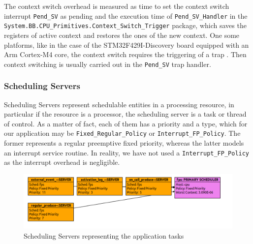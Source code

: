 \documentclass{article}
\begin{document}
The context switch overhead is measured as time to set the context switch interrupt \texttt{Pend\_SV} as pending and the execution time of \texttt{Pend\_SV\_Handler} in the \texttt{System.BB.CPU\_Primitives.Context\_Switch\_Trigger} package, which saves the registers of active context and restores the ones of the new context. One some platforms, like in the case of the STM32F429I-Discovery board equipped with an Arm Cortex-M4 core, the context switch requires the triggering of a trap \cite{pendsv}. Then context switching is usually carried out in the \texttt{Pend\_SV} trap handler.

\subsubsection{Scheduling Servers}

Scheduling Servers represent schedulable entities in a processing resource, in particular if the resource is a processor, the scheduling server is a task or thread of control. As a matter of fact, each of them has a priority and a type, which for our application may be \texttt{Fixed\_Regular\_Policy} or \texttt{Interrupt\_FP\_Policy}. The former represents a regular preemptive fixed priority, whereas the latter models an interrupt service routine. In reality, we have not used a \texttt{Interrupt\_FP\_Policy} as the interrupt overhead is negligible.

\begin{figure}[!htbp]
\centering
\includegraphics[width=5in]{images/scheduling-servers}
\caption{Scheduling Servers representing the application tasks}
\label{scheduling-servers}
\end{figure}
\end{document}
